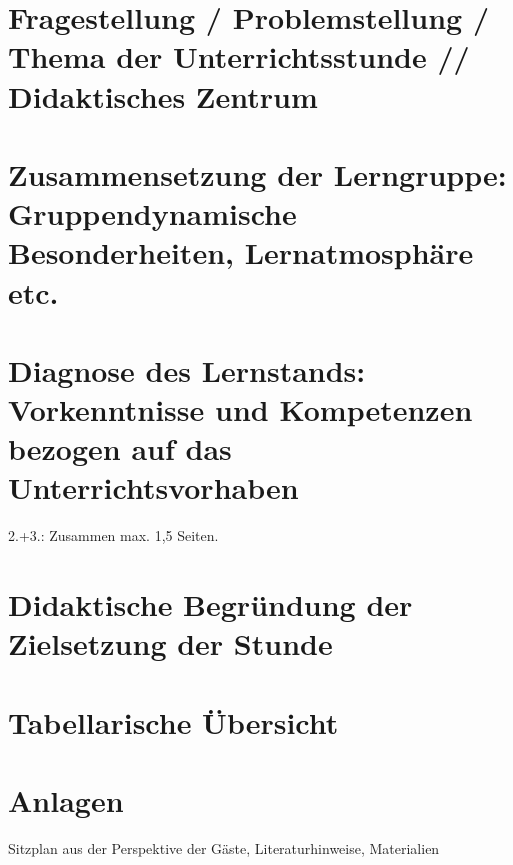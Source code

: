 \documentclass{kurzentwurf}
\begin{document}
\maketitle

\section{Fragestellung / Problemstellung / Thema der Unterrichtsstunde // Didaktisches Zentrum} %

\section{Zusammensetzung der Lerngruppe: Gruppendynamische Besonderheiten, Lernatmosphäre etc.}
\section{Diagnose des Lernstands: Vorkenntnisse und Kompetenzen bezogen auf das Unterrichtsvorhaben}

2.+3.: Zusammen max. 1,5 Seiten.

\section{Didaktische Begründung der Zielsetzung der Stunde} %


\section{Tabellarische Übersicht} %

\begin{uebersicht}
\end{uebersicht}

\section{Anlagen}
Sitzplan aus der Perspektive der Gäste, Literaturhinweise, Materialien


\pagebreak
\printbibliography[title={Literatur}]
\end{document}
